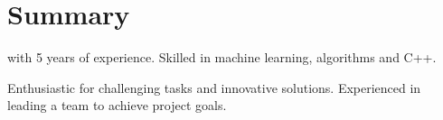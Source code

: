 \section{Summary}
\summaryPosition\space with 5 years of experience. Skilled in machine learning, algorithms and C++.

Enthusiastic for challenging tasks and innovative solutions. Experienced in leading a team to achieve project goals.
